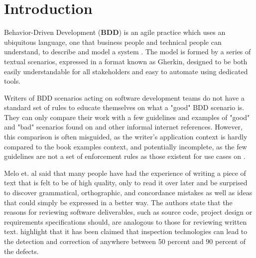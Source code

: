 \chapter{\label{chap:chap1}{Introduction}}


Behavior-Driven Development (\textbf{BDD}) is an agile practice which uses an ubiquitous language, one that business people and technical people can understand, to describe and model a system \cite{Smart_2014}. The model is formed by a series of textual scenarios, expressed in a format known as Gherkin, designed to be both easily understandable for all stakeholders and easy to automate using dedicated tools. 

Writers of BDD scenarios acting on software development teams do not have a standard set of rules to educate themselves on what a "good" BDD scenario is. They can only compare their work with a few guidelines and examples of "good" and "bad" scenarios found on \cite{Smart_2014} and other informal internet references. However, this comparison is often misguided, as the writer's application context is hardly compared to the book examples context, and potentially incomplete, as the few guidelines are not a set of enforcement rules as those existent for use cases on \cite{Phalp_2011}. 

Melo et. al \cite{Melo_2001} said that many people have had the experience of writing a piece of text that is felt to be of high quality, only to read it over later and be surprised to discover grammatical, orthographic, and concordance mistakes as well as ideas that could simply be expressed in a better way. The authors state that the reasons for reviewing software deliverables, such as source code, project design or requirements specifications should, are analogous to those for reviewing written text. \cite{Laitenberger_2002} highlight that it has been claimed that inspection technologies can lead to the detection and correction of anywhere between 50 percent and 90 percent of the defects. 


